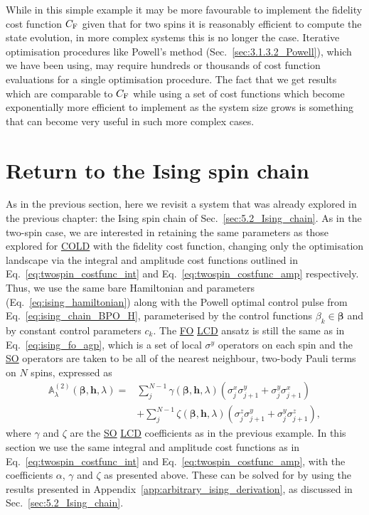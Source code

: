 \documentclass[a4paper,oneside,11pt]{book}
\newcommand{\betabb}{\boldsymbol{\beta}}
\newcommand{\hbb}{\boldsymbol{h}}
\newcommand{\sx}{\sigma^x}
\newcommand{\sy}{\sigma^y}
\newcommand{\sz}{\sigma^z}
\newcommand{\approxAGP}{\mathbb{A}_{\lambda}}
\newcommand{\acrref}[1]{\hyperref[acr:#1]{#1}}
\begin{document}
While in this simple example it may be more favourable to implement the fidelity cost function $C_{\rm F}$ given that for two spins it is reasonably efficient to compute the state evolution, in more complex systems this is no longer the case. Iterative optimisation procedures like Powell's method (Sec.~\ref{sec:3.1.3.2_Powell}), which we have been using, may require hundreds or thousands of cost function evaluations for a single optimisation procedure. The fact that we get results which are comparable to $C_{\rm F}$ while using a set of cost functions which become exponentially more efficient to implement as the system size grows is something that can become very useful in such more complex cases.

\section{Return to the Ising spin chain}\label{sec:7.2_ising_ho_lcd}

As in the previous section, here we revisit a system that was already explored in the previous chapter: the Ising spin chain of Sec.~\ref{sec:5.2_Ising_chain}. As in the two-spin case, we are interested in retaining the same parameters as those explored for \acrref{COLD} with the fidelity cost function, changing only the optimisation landscape via the integral and amplitude cost functions outlined in Eq.~\eqref{eq:twospin_costfunc_int} and Eq.~\eqref{eq:twospin_costfunc_amp} respectively. Thus, we use the same bare Hamiltonian and parameters (Eq.~\eqref{eq:ising_hamiltonian}) along with the Powell optimal control pulse from Eq.~\eqref{eq:ising_chain_BPO_H}, parameterised by the control functions $\beta_k \in \betabb$ and by constant control parameters $c_k$. The \acrref{FO} \acrref{LCD} ansatz is still the same as in Eq.~\eqref{eq:ising_fo_agp}, which is a set of local $\sy$ operators on each spin and the \acrref{SO} operators are taken to be all of the nearest neighbour, two-body Pauli terms on $N$ spins, expressed as
\begin{equation}\label{eq:ising_so_lcd_terms}
    \begin{aligned}
        \approxAGP^{(2)}(\betabb, \hbb, \lambda) = & \sum_j^{N-1} \gamma(\betabb, \hbb, \lambda) (\sx_j\sy_{j+1} + \sy_j\sx_{j+1}) \\
        &+ \sum_j^{N-1} \zeta(\betabb, \hbb, \lambda) (\sz_j\sy_{j+1} + \sy_j\sz_{j+1}),
    \end{aligned}
\end{equation}
where $\gamma$ and $\zeta$ are the \acrref{SO} \acrref{LCD} coefficients as in the previous example. In this section we use the same integral and amplitude cost functions as in Eq.~\eqref{eq:twospin_costfunc_int} and Eq.~\eqref{eq:twospin_costfunc_amp}, with the coefficients $\alpha$, $\gamma$ and $\zeta$ as presented above. These can be solved for by using the results presented in Appendix~\ref{app:arbitrary_ising_derivation}, as discussed in Sec.~\ref{sec:5.2_Ising_chain}.
\end{document}
